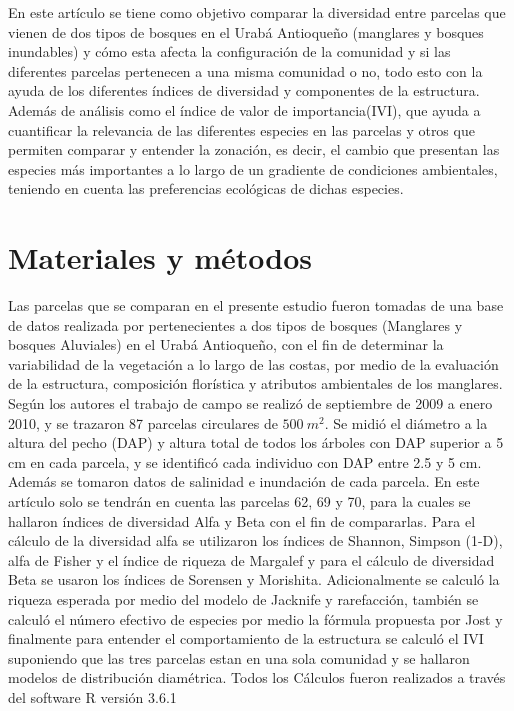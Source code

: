 \documentclass[conference,final,12pt,]{IEEEtran}
\begin{document}
En este artículo se tiene como objetivo comparar la diversidad entre
parcelas que vienen de dos tipos de bosques en el Urabá Antioqueño
(manglares y bosques inundables) y cómo esta afecta la configuración de
la comunidad y si las diferentes parcelas pertenecen a una misma
comunidad o no, todo esto con la ayuda de los diferentes índices de
diversidad y componentes de la estructura. Además de análisis como el
índice de valor de importancia(IVI), que ayuda a cuantificar la
relevancia de las diferentes especies en las parcelas y otros que
permiten comparar y entender la zonación, es decir, el cambio que
presentan las especies más importantes a lo largo de un gradiente de 
condiciones ambientales, teniendo en cuenta las preferencias ecológicas
de dichas especies.

\hypertarget{materiales-y-muxe9todos}{%
\section{Materiales y métodos}\label{materiales-y-muxe9todos}}

Las parcelas que se comparan en el presente estudio fueron tomadas de
una base de datos realizada por \citep{AB} pertenecientes a dos tipos de
bosques (Manglares y bosques Aluviales) en el Urabá Antioqueño, con el
fin de determinar la variabilidad de la vegetación a lo largo de las
costas, por medio de la evaluación de la estructura, composición
florística y atributos ambientales de los manglares. Según los autores
el trabajo de campo se realizó de septiembre de 2009 a enero 2010, y se
trazaron 87 parcelas circulares de \(500 \ m^2\). Se midió el diámetro a la
altura del pecho (DAP) y altura total de todos los árboles con DAP
superior a 5 cm en cada parcela, y se identificó cada individuo con DAP
entre 2.5 y 5 cm. Además se tomaron datos de salinidad e inundación de
cada parcela. En este artículo solo se tendrán en cuenta las parcelas
62, 69 y 70, para la cuales se hallaron índices de diversidad Alfa y
Beta con el fin de compararlas. Para el cálculo de la diversidad alfa se
utilizaron los índices de Shannon, Simpson (1-D), alfa de Fisher y el
índice de riqueza de Margalef y para el cálculo de diversidad Beta se
usaron los índices de Sorensen y Morishita. Adicionalmente se calculó la
riqueza esperada por medio del modelo de Jacknife y rarefacción, también
se calculó el número efectivo de especies por medio la fórmula propuesta
por Jost y finalmente para entender el comportamiento de la estructura
se calculó el IVI suponiendo que las tres parcelas estan en una sola comunidad y
se hallaron modelos de distribución diamétrica. Todos los Cálculos
fueron realizados a través del software R versión 3.6.1
\end{document}
